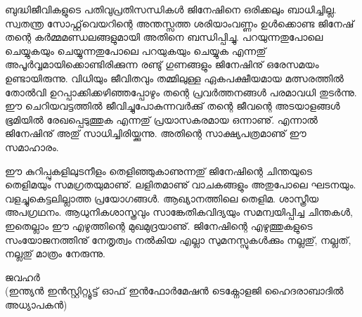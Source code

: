 ബുദ്ധിജീവികളുടെ പതിവുപ്രതിസന്ധികള്‍ ജിനേഷിനെ ഒരിക്കലും ബാധിച്ചില്ല. സ്വതന്ത്ര സോഫ്റ്റ്‌വെയറിന്റെ അന്തസ്സത്ത ശരിയാംവണ്ണം 
ഉള്‍ക്കൊണ്ട ജിനേഷ് തന്റെ കര്‍മ്മമണ്ഡലങ്ങളുമായി അതിനെ ബന്ധിപ്പിച്ചു. പറയുന്നതുപോലെ ചെയ്യുകയും ചെയ്യുന്നതുപോലെ പറയുകയും 
ചെയ്യുക എന്നതു് അപൂര്‍വ്വമായിക്കൊണ്ടിരിക്കുന്ന രണ്ടു് ഗുണങ്ങളും ജിനേഷിനു് ഒരേസമയം ഉണ്ടായിരുന്നു. വിധിയും ജീവിതവും തമ്മിലുള്ള 
ഏകപക്ഷീയമായ മത്സരത്തില്‍ തോല്‍വി ഉറപ്പാക്കിക്കഴിഞ്ഞപ്പോഴും തന്റെ പ്രവര്‍ത്തനങ്ങള്‍ പരമാവധി തുടര്‍ന്നു.  ഈ ചെറിയവട്ടത്തില്‍ 
ജീവിച്ചുപോകുന്നവര്‍ക്കു് തന്റെ ജീവന്റെ അടയാളങ്ങള്‍ ഭൂമിയില്‍ രേഖപ്പെടുത്തുക എന്നതു് പ്രയാസകരമായ ഒന്നാണു്. എന്നാല്‍ ജിനേഷിനു് 
അതു് സാധിച്ചിരിയ്ക്കുന്നു. അതിന്റെ സാക്ഷ്യപത്രമാണു് ഈ സമാഹാരം.

ഈ കുറിപ്പുകളിലുടനീളം തെളിഞ്ഞുകാണുന്നതു് ജിനേഷിന്റെ ചിന്തയുടെ തെളിമയും സമഗ്രതയുമാണു്. ലളിതമാണു് വാചകങ്ങളും അതുപോലെ ഘടനയും. 
വളച്ചുകെട്ടലില്ലാത്ത പ്രയോഗങ്ങള്‍. ആഖ്യാനത്തിലെ തെളിമ. ശാസ്ത്രീയ അപഗ്രഥനം. ആധുനികശാസ്ത്രവും സാങ്കേതികവിദ്യയും സമന്വയിപ്പിച്ച 
ചിന്തകള്‍, ഇതെല്ലാം ഈ എഴുത്തിന്റെ മുഖമുദ്രയാണു്. ജിനേഷിന്റെ എഴുത്തുകളുടെ സംയോജനത്തിനു് നേതൃത്വം നല്‍കിയ എല്ലാ സുമനസ്സുകള്‍ക്കും 
നല്ലതു്, നല്ലത്, നല്ലതു് മാത്രം നേരുന്നു. 

\begin{flushright}ജവഹര്‍ \\(ഇന്ത്യന്‍ ഇന്‍സ്റ്റിറ്റ്യൂട്ട് ഓഫ് ഇന്‍ഫോര്‍മേഷന്‍ ടെക്നോളജി ഹൈദരാബാദില്‍ അധ്യാപകന്‍) \end{flushright}
\newpage
